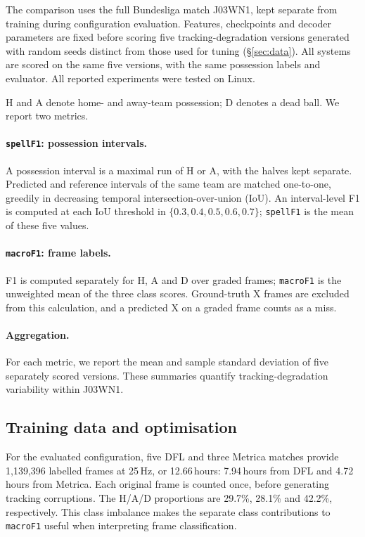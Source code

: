 \documentclass[10pt,a4paper,twocolumn]{article}
\newcommand{\spellF}{\texttt{spellF1}}
\newcommand{\macroF}{\texttt{macroF1}}
\begin{document}
The comparison uses the full Bundesliga match J03WN1, kept separate from training during
configuration evaluation. Features, checkpoints and decoder parameters are fixed before scoring
five tracking-degradation versions generated with random seeds distinct from those used for
tuning (\S\ref{sec:data}). All systems are scored on the same five versions, with the same
possession labels and evaluator. All reported experiments were tested on Linux.

H and A denote home- and away-team possession; D denotes a dead ball. We report two metrics.

\paragraph{\spellF{}: possession intervals.} A possession interval is a maximal run of H or A,
with the halves kept separate. Predicted and reference intervals of the same team are matched
one-to-one, greedily in decreasing temporal intersection-over-union (IoU). An interval-level F1
is computed at each IoU threshold in $\{0.3,0.4,0.5,0.6,0.7\}$; \spellF{} is the mean of these
five values.

\paragraph{\macroF{}: frame labels.} F1 is computed separately for H, A and D over graded
frames; \macroF{} is the unweighted mean of the three class scores. Ground-truth X frames are
excluded from this calculation, and a predicted X on a graded frame counts as a miss.

\paragraph{Aggregation.} For each metric, we report the mean and sample standard deviation of
five separately scored versions. These summaries quantify tracking-degradation variability
within J03WN1.

\subsection{Training data and optimisation}

For the evaluated configuration, five DFL and three Metrica matches provide 1,139,396 labelled
frames at 25\,Hz, or 12.66\,hours: 7.94\,hours from DFL and 4.72\,hours from Metrica. Each original
frame is counted once, before generating tracking corruptions. The H/A/D proportions are
29.7\%, 28.1\% and 42.2\%, respectively. This class imbalance makes the separate class
contributions to \macroF{} useful when interpreting frame classification.
\end{document}
